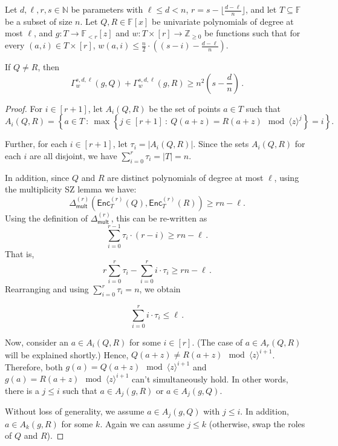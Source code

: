 \documentclass{article}
\def\Integer{\mathbb{Z}}
\def\Natural{\mathbb{N}}
\def\Field{\mathbb{F}}
\let\N\Natural
\let\Z\Integer
\let\F\Field
\def\abs#1{\left| #1 \right|}
\def\inbrace#1{\left\{ #1 \right\}}
\def\setdef#1#2{\inbrace{ #1 \ \colon \ #2}}      %
\newcommand{\enc}{{\mathsf{Enc}}}
\newcommand{\Delm}{\Delta_{\mathsf{mult}}}
\begin{document}
	\begin{lemma}\label{lem: gamma triangle}
		Let $d, \ell,r,s \in \N$ be parameters with $\ell \leq d < n$, $r =  s -
		\lfloor \frac{d-\ell}{n} \rfloor $, and let $T \subseteq \F$ be a
		subset of size $n$. Let $Q, R \in \F[x]$ be univariate polynomials of
		degree at most $\ell$, and $g\colon T \to \F_{<r}[z]$ and $w\colon T
		\times [r] \to \Z_{\geq 0}$ be functions such that for every $(a, i)
		\in T \times [r]$, $w(a,i) \leq \frac{n}{2}\cdot \left((s-i) - \frac{d-\ell}{n}\right)$. 
		
		If $Q \neq R$, then 
		\[
		\Gamma_w^{s,d,\ell}(g, Q) + \Gamma_w^{s,d,\ell}(g, R) \geq n^2\left(s - \frac{d}n\right) \, .
		\]
		
	\end{lemma}
	\begin{proof}
		For $i\in[r+1]$, let $A_i(Q,R)$ be the set of points $a \in T$ such that
		\[
		A_i(Q,R)=\setdef{a\in T}{\max{\setdef{j\in [r+1]}{Q(a+z)=R(a+z) \mod \langle z\rangle ^{j}}}=i}.
		\]
		
		Further, for each $i \in [r+1]$, let $\tau_i = \abs{A_i(Q, R)}$. Since the sets $A_i(Q, R)$ for each $i$ are all disjoint, we have $\sum_{i=0}^r \tau_i = \abs{T} = n$. 
		
		In addition, since $Q$ and $R$ are distinct polynomials of degree at most $\ell$, using the multiplicity SZ lemma we have:
		\[
		\Delm^{(r)} (\enc^{(r)}_T(Q), \enc^{(r)}_T(R)) \geq rn-\ell.
		\]
		Using the definition of $\Delm^{(r)}$, this can be re-written as 
		\[
		\sum_{i=0}^{r-1}  \tau_i \cdot (r-i) \geq rn-\ell \, .
		\]
		That is,
		\[ r \sum_{i=0}^{r} {\tau_i} - \sum_{i=0}^{r} i \cdot {\tau_i}  \geq rn-\ell \, .
		\]
		Rearranging and using $\sum_{i=0}^{r} \tau_i = n$, we obtain 
		
		\[ 
		\sum_{i=0}^{r} i \cdot \tau_i \leq \ell \, .
		\] 
		
		Now, consider an $a \in A_i(Q, R)$ for some $i\in [r]$. (The case of $a \in A_r(Q, R)$ will be explained shortly.) Hence, $Q(a+z)\neq R(a+z)\mod \langle z\rangle^{i+1}$. Therefore, both $g(a)=Q(a+z) \mod \langle z \rangle^{i+1}$ and $g(a)= R(a+z)\mod \langle z\rangle^{i+1}$ can't simultaneously hold. In other words, there is a $j \leq i$ such that $a \in A_j(g,R)$ or $a\in A_j(g,Q)$.
		
		Without loss of generality, we assume $a \in A_j(g, Q)$ with $j \leq i$. In addition, $a \in A_k(g, R)$ for some $k$. Again we can assume $j \leq k$ (otherwise, swap the roles of $Q$ and $R$).
		

\end{proof}
\end{document}
